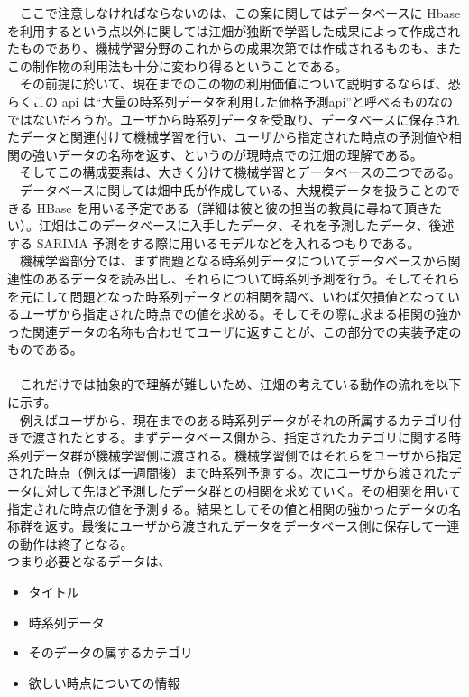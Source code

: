 \documentclass{scrartcl}
\begin{document}
　ここで注意しなければならないのは、この案に関してはデータベースに Hbase を利用するという点以外に関しては江畑が独断で学習した成果によって作成されたものであり、機械学習分野のこれからの成果次第では作成されるものも、またこの制作物の利用法も十分に変わり得るということである。\\
　その前提に於いて、現在までのこの物の利用価値について説明するならば、恐らくこの api は``大量の時系列データを利用した価格予測api''と呼べるものなのではないだろうか。ユーザから時系列データを受取り、データベースに保存されたデータと関連付けて機械学習を行い、ユーザから指定された時点の予測値や相関の強いデータの名称を返す、というのが現時点での江畑の理解である。\\
　そしてこの構成要素は、大きく分けて機械学習とデータベースの二つである。\\
　データベースに関しては畑中氏が作成している、大規模データを扱うことのできる HBase を用いる予定である（詳細は彼と彼の担当の教員に尋ねて頂きたい）。江畑はこのデータベースに入手したデータ、それを予測したデータ、後述する SARIMA 予測をする際に用いるモデルなどを入れるつもりである。\\
　機械学習部分では、まず問題となる時系列データについてデータベースから関連性のあるデータを読み出し、それらについて時系列予測を行う。そしてそれらを元にして問題となった時系列データとの相関を調べ、いわば欠損値となっているユーザから指定された時点での値を求める。そしてその際に求まる相関の強かった関連データの名称も合わせてユーザに返すことが、この部分での実装予定のものである。\\
　\\
　これだけでは抽象的で理解が難しいため、江畑の考えている動作の流れを以下に示す。\\
　例えばユーザから、現在までのある時系列データがそれの所属するカテゴリ付きで渡されたとする。まずデータベース側から、指定されたカテゴリに関する時系列データ群が機械学習側に渡される。機械学習側ではそれらをユーザから指定された時点（例えば一週間後）まで時系列予測する。次にユーザから渡されたデータに対して先ほど予測したデータ群との相関を求めていく。その相関を用いて指定された時点の値を予測する。結果としてその値と相関の強かったデータの名称群を返す。最後にユーザから渡されたデータをデータベース側に保存して一連の動作は終了となる。\\

つまり必要となるデータは、\\
\begin{itemize}
\item タイトル\\
\item 時系列データ\\
\item そのデータの属するカテゴリ\\
\item 欲しい時点についての情報\\
\end{itemize}
\end{document}
